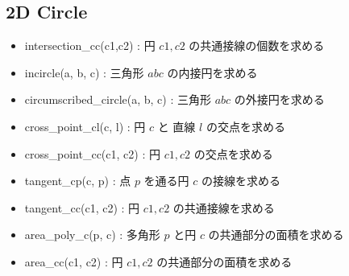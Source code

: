 \subsection{2D Circle}

\begin{itemize}
    \item intersection\_cc(c1,c2) : 円 $c1, c2$ の共通接線の個数を求める
    \item incircle(a, b, c) : 三角形 $abc$ の内接円を求める
    \item circumscribed\_circle(a, b, c) : 三角形 $abc$ の外接円を求める
    \item cross\_point\_cl(c, l) : 円 $c$ と 直線 $l$ の交点を求める
    \item cross\_point\_cc(c1, c2) : 円 $c1, c2$ の交点を求める
    \item tangent\_cp(c, p) : 点 $p$ を通る円 $c$ の接線を求める
    \item tangent\_cc(c1, c2) : 円 $c1, c2$ の共通接線を求める
    \item area\_poly\_c(p, c) : 多角形 $p$ と円 $c$ の共通部分の面積を求める
    \item area\_cc(c1, c2) : 円 $c1, c2$ の共通部分の面積を求める
\end{itemize}

